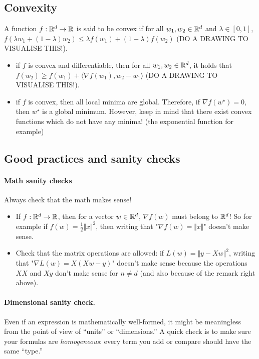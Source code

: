 \subsection{Convexity}

A function $f:\mathbb{R}^d \to \mathbb{R}$ is said to be convex if for all $w_1, w_2 \in \mathbb{R}^d$ and $\lambda \in [0, 1]$, $f(\lambda w_1 + (1 - \lambda) w_2) \leq \lambda f(w_1) + (1 - \lambda) f(w_2)$ (DO A DRAWING TO VISUALISE THIS!). 

\begin{itemize}
    \item if $f$ is convex and differentiable, then for all $w_1, w_2 \in \mathbb{R}^d$, it holds that $f(w_2) \geq f(w_1) + \langle \nabla f(w_1), w_2 - w_1 \rangle$ (DO A DRAWING TO VISUALISE THIS!).
    \item if $f$ is convex, then all local minima are global. Therefore, if $\nabla f(w^\star) = 0$, then $w^\star$ is a global minimum. However, keep in mind that there exist convex functions which do not have any minima! (the exponential function for example)
\end{itemize}

\subsection{Good practices and sanity checks}

\paragraph{Math sanity checks} Always check that the math makes sense! 

\begin{itemize}
    \item  If $f : \mathbb{R}^d \to \mathbb{R}$, then for a vector $w \in \mathbb{R}^d$, $\nabla f(w)$ must belong to $\mathbb{R}^d$! So for example if $f(w) = \frac{1}{2} \Vert x \Vert^2$, then writing that "$\nabla f(w) = \Vert x \Vert$" doesn't make sense. 
    \item Check that the matrix operations are allowed: if $L(w) = \Vert y - X w \Vert^2$, writing that "$\nabla L(w) = X (X w -y)$" doesn't make sense because the operations $X X$ and $X y$ don't make sense for $n \neq d$ (and also because of the remark right above).
\end{itemize}


\paragraph{Dimensional sanity check.}  
Even if an expression is mathematically well-formed, it might be meaningless from the point of view of ``units'' or ``dimensions.''  
A quick check is to make sure your formulas are \emph{homogeneous}: every term you add or compare should have the same ``type.'' 
 
